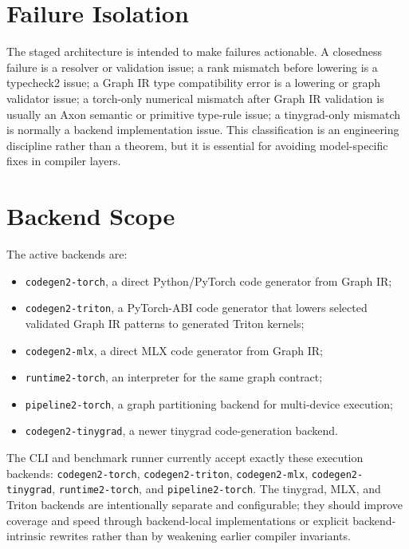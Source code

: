 \documentclass{article}
\newcommand{\code}[1]{\texttt{#1}}
\begin{document}
\section{Failure Isolation}

The staged architecture is intended to make failures actionable.  A closedness
failure is a resolver or validation issue; a rank mismatch before lowering is a
typecheck2 issue; a Graph IR type compatibility error is a lowering or graph
validator issue; a torch-only numerical mismatch after Graph IR validation is
usually an Axon semantic or primitive type-rule issue; a tinygrad-only mismatch
is normally a backend implementation issue.  This classification is an
engineering discipline rather than a theorem, but it is essential for avoiding
model-specific fixes in compiler layers.

\section{Backend Scope}

The active backends are:
\begin{itemize}[leftmargin=*]
\item \code{codegen2-torch}, a direct Python/PyTorch code generator from Graph IR;
\item \code{codegen2-triton}, a PyTorch-ABI code generator that lowers selected
validated Graph IR patterns to generated Triton kernels;
\item \code{codegen2-mlx}, a direct MLX code generator from Graph IR;
\item \code{runtime2-torch}, an interpreter for the same graph contract;
\item \code{pipeline2-torch}, a graph partitioning backend for multi-device execution;
\item \code{codegen2-tinygrad}, a newer tinygrad code-generation backend.
\end{itemize}
The CLI and benchmark runner currently accept exactly these execution backends:
\code{codegen2-torch}, \code{codegen2-triton}, \code{codegen2-mlx},
\code{codegen2-tinygrad}, \code{runtime2-torch}, and
\code{pipeline2-torch}.  The tinygrad, MLX, and Triton backends are
intentionally separate and configurable; they should improve coverage and speed
through backend-local implementations or explicit backend-intrinsic rewrites
rather than by weakening earlier compiler invariants.
\end{document}

